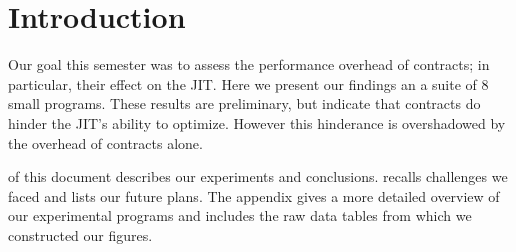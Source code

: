 \section{Introduction}
\label{intro}

Our goal this semester was to assess the performance overhead of contracts; in particular, their effect on the JIT.
Here we present our findings an a suite of 8 small programs.
These results are preliminary, but indicate that contracts do hinder the JIT's ability to optimize.
However this hinderance is overshadowed by the overhead of contracts alone.

 of this document describes our experiments and conclusions.
 recalls challenges we faced and lists our future plans.
The appendix gives a more detailed overview of our experimental programs and includes the raw data tables from which we constructed our figures.
